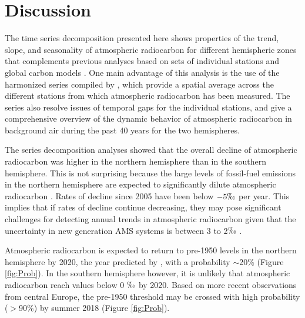 \documentclass[a4paper, 11pt]{article}
\begin{document}


\section{Discussion}
The time series decomposition presented here shows properties of the trend, slope, and seasonality of atmospheric radiocarbon for different hemispheric zones that complements previous analyses based on sets of individual stations \citep{Levin2010Tellus, Graven2012JGR, Levin2013Tellus} and global carbon models \citep{Caldeira1998GRL, Randerson2002GBC, Turnbull2009JGR, Levin2010Tellus, Graven2015PNAS}. One main advantage of this analysis is the use of the harmonized series compiled by \citet{Hua2013Radiocarbon}, which provide a spatial average across the different stations from which atmospheric radiocarbon has been measured. The series also resolve issues of temporal gaps for the individual stations, and give a comprehensive overview of the dynamic behavior of atmospheric radiocarbon in background air during the past 40 years for the two hemispheres. 

The series decomposition analyses showed that the overall decline of atmospheric radiocarbon was higher in the northern hemisphere than in the southern hemisphere. This is not surprising because the large levels of fossil-fuel emissions in the northern hemisphere are expected to significantly dilute atmospheric radiocarbon \citep{Levin1989Radiocarbon, Levin2010Tellus, Turnbull2009JGR, Graven2012JGR}. Rates of decline since 2005 have been below $ -5 \permil$ per year. This implies that if rates of decline continue decreasing, they may pose significant challenges for detecting annual trends in atmospheric radiocarbon given that the uncertainty in new generation AMS systems is between 3 to 2$\permil$ \citep{Synal2007, Wacker2010}.

Atmospheric radiocarbon is expected to return to pre-1950 levels in the northern hemisphere by 2020, the year predicted by  \citet{Caldeira1998GRL}, with a probability $\sim$20\% (Figure \ref{fig:Prob}). In the southern hemisphere however, it is unlikely that atmospheric radiocarbon reach values below 0 $\permil$ by 2020. Based on more recent observations from central Europe, the pre-1950 threshold may be crossed with high probability ($>$90\%) by summer 2018 (Figure \ref{fig:Prob}). 
\end{document}
